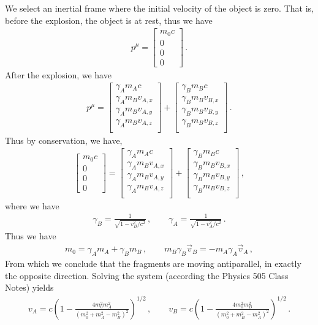 \documentclass[11pt, onesided]{book}
\theoremstyle{break}
\theoremstyle{break}
\newcommand{\bmat}[1]{\begin{bmatrix} #1 \end{bmatrix}}
\begin{document}
We select an inertial frame where the initial velocity of the object is zero. That is, before the explosion, the object is at rest, thus we have
\begin{align*}
p^\mu = \bmat{m_0 c \\ 0 \\ 0 \\ 0}\,.
\end{align*}
After the explosion, we have
\begin{align*}
p^\mu = \bmat{\gamma_A m_A c \\ 
\gamma_A m_B v_{A,x}\\
\gamma_A m_B v_{A,y}\\
\gamma_A m_B v_{A,z}\\
}+
\bmat{\gamma_B m_B c \\ 
\gamma_B m_B v_{B,x}\\
\gamma_B m_B v_{B,y}\\
\gamma_B m_B v_{B,z}\\
}\,.
\end{align*}
Thus by conservation, we have,
\begin{align*}
\bmat{m_0 c \\ 0 \\ 0 \\ 0}=
\bmat{\gamma_A m_A c \\ 
\gamma_A m_B v_{A,x}\\
\gamma_A m_B v_{A,y}\\
\gamma_A m_B v_{A,z}\\
}+
\bmat{\gamma_B m_B c \\ 
\gamma_B m_B v_{B,x}\\
\gamma_B m_B v_{B,y}\\
\gamma_B m_B v_{B,z}\\
}\,,
\end{align*}
where we have
\begin{align*}
\gamma_B = \frac{1}{\sqrt{1- v_B^2/c^2}}\,,\qquad
\gamma_A = \frac{1}{\sqrt{1- v_A^2/c^2}}\,.
\end{align*}
Thus we have
\begin{align*}
m_0  = \gamma_A m_A + \gamma_B m_B\,,\qquad
m_B \gamma_B \vec{v}_B = -m_A \gamma_A \vec{v}_A\,,
\end{align*}
From which we conclude that the fragments are moving antiparallel, in exactly the opposite direction. Solving the system (according the Physics 505 Class Notes) yields
\begin{align*}
v_A = c\left( 1 - \frac{4m_0^2 m_A^2}{(m_0^2 + m_A^2 - m_B^2)^{2}}\right)^{1/2}\,,\qquad
v_B = c\left( 1 - \frac{4m_0^2 m_B^2}{(m_0^2 + m_B^2 - m_A^2)^{2}}\right)^{1/2}\,.
\end{align*}
\end{document}
